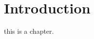%
%


\chapter{Introduction}
\vspace{-2em}
\minitoc
this is a chapter.
\startarabicpagenumbering %

